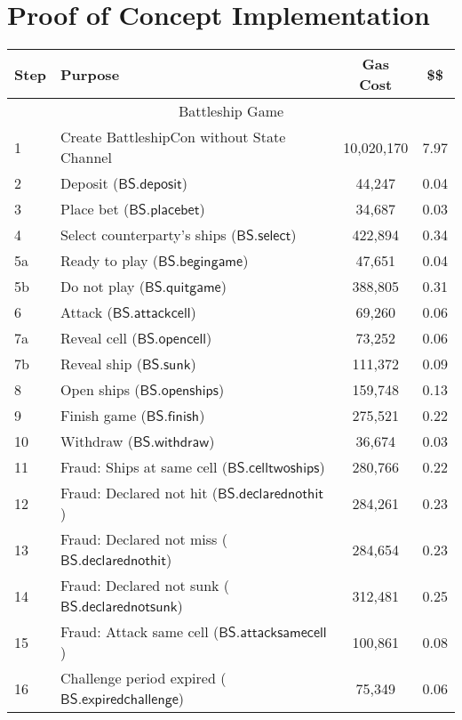\documentclass{llncs}
\newcommand{\battleshipattackcell}{\mathsf{BS.attackcell}}
\newcommand{\battleshipbegin}{\mathsf{BS.begingame}}
\newcommand{\battleshipquit}{\mathsf{BS.quitgame}}
\newcommand{\battleshipplacebet}{\mathsf{BS.placebet}}
\newcommand{\battleshipselectboard}{\mathsf{BS.select}}
\newcommand{\battleshiprevealcell}{\mathsf{BS.opencell}}
\newcommand{\battleshipsinking}{\mathsf{BS.sunk}}
\newcommand{\battleshiprevealboard}{\mathsf{BS.openships}}
\newcommand{\battleshipdeposit}{\mathsf{BS.deposit}}
\newcommand{\battleshipwithdraw}{\mathsf{BS.withdraw}}
\newcommand{\battleshipfinish}{\mathsf{BS.finish}}
\newcommand{\battleshipdeclarednotsunk}{\mathsf{BS.declarednotsunk}}
\newcommand{\battleshipdeclarednothit}{\mathsf{BS.declarednothit}}
\newcommand{\battleshipsamecell}{\mathsf{BS.attacksamecell}}
\newcommand{\battleshiptwoships}{\mathsf{BS.celltwoships}}
\newcommand{\battleshipchallengeexpired}{\mathsf{BS.expiredchallenge}}
\begin{document}
	\section{Proof  of Concept Implementation}
	
		\begin{table}
		\centering
		\begin{tabular}[]{l l c c}
			
			\textbf{Step} & \textbf{Purpose} & \textbf{Gas Cost} & \textbf{\$\$}  \\ 
			\hline
			\multicolumn{4}{c}{Battleship Game} \\
			\hline
			1 & Create BattleshipCon without State Channel & 10,020,170 & 7.97 \\
			2 & Deposit ($\battleshipdeposit$) & 44,247 & 0.04 \\
			3 & Place bet ($\battleshipplacebet$)& 34,687 & 0.03 \\
			4 & Select counterparty's ships ($\battleshipselectboard$) & 422,894 & 0.34 \\ 
			5a & Ready to play ($\battleshipbegin$) & 47,651 & 0.04 \\
			5b & Do not play ($\battleshipquit$) & 388,805 & 0.31 \\
			6 & Attack ($\battleshipattackcell$) & 69,260 & 0.06 \\
			7a & Reveal cell ($\battleshiprevealcell$) & 73,252 & 0.06 \\
			7b & Reveal ship ($\battleshipsinking$)& 111,372 & 0.09  \\
			8 & Open ships ($\battleshiprevealboard$) & 159,748 & 0.13 \\
			9 & Finish game ($\battleshipfinish$) & 275,521 & 0.22 \\
			10 & Withdraw ($\battleshipwithdraw$) & 36,674 & 0.03 \\ 
			11 & Fraud: Ships at same cell ($\battleshiptwoships$) & 280,766 & 0.22\\
			12 & Fraud: Declared not hit ($\battleshipdeclarednothit$) & 284,261 & 0.23 \\
			13 & Fraud: Declared not miss ($\battleshipdeclarednothit$) & 284,654 & 0.23 \\
			14 & Fraud: Declared not sunk ($\battleshipdeclarednotsunk$) & 312,481 & 0.25 \\
			15 & Fraud: Attack same cell ($\battleshipsamecell$) & 100,861 & 0.08 \\
			16 & Challenge period expired ($\battleshipchallengeexpired$) &75,349 & 0.06 \\

\end{tabular}
\end{table}
\end{document}
